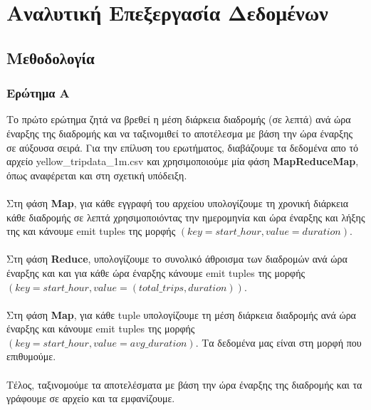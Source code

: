 \documentclass{ntua}
\begin{document}
\justify

\section{Αναλυτική Επεξεργασία Δεδομένων}

\subsection{Μεθοδολογία}

\subsubsection{Ερώτημα Α}
Το πρώτο ερώτημα ζητά να βρεθεί η μέση διάρκεια διαδρομής (σε λεπτά) ανά ώρα έναρξης της διαδρομής και να 
ταξινομιθεί το αποτέλεσμα με βάση την ώρα έναρξης σε αύξουσα σειρά. Για την επίλυση του ερωτήματος, διαβάζουμε τα δεδομένα απο τό αρχείο yellow\_tripdata\_1m.csv και χρησιμοποιούμε μία φάση \textbf{MapReduceMap}, όπως αναφέρεται και στη σχετική υπόδειξη.\\ \\ 
Στη φάση \textbf{Map}, για κάθε εγγραφή του αρχείου υπολογίζουμε τη χρονική διάρκεια κάθε διαδρομής σε λεπτά χρησιμοποιόντας την ημερομηνία και ώρα έναρξης και λήξης της και κάνουμε emit tuples της μορφής $( key = start\_hour, value = duration)$. \\ \\
Στη φάση \textbf{Reduce}, υπολογίζουμε το συνολικό άθροισμα των διαδρομών ανά ώρα έναρξης και 
και για κάθε ώρα έναρξης κάνουμε emit tuples της μορφής $( key = start\_hour, value = (total\_trips,duration))$.\\ \\ 
Στη φάση \textbf{Map}, για κάθε tuple υπολογίζουμε τη μέση διάρκεια διαδρομής ανά ώρα έναρξης και κάνουμε emit tuples της μορφής $( key = start\_hour, value = avg\_duration)$. Τα δεδομένα μας είναι στη μορφή που επιθυμούμε.  \\ \\
Τέλος, ταξινομούμε τα αποτελέσματα με βάση την ώρα έναρξης της διαδρομής και τα γράφουμε σε αρχείο και τα εμφανίζουμε.
\end{document}
